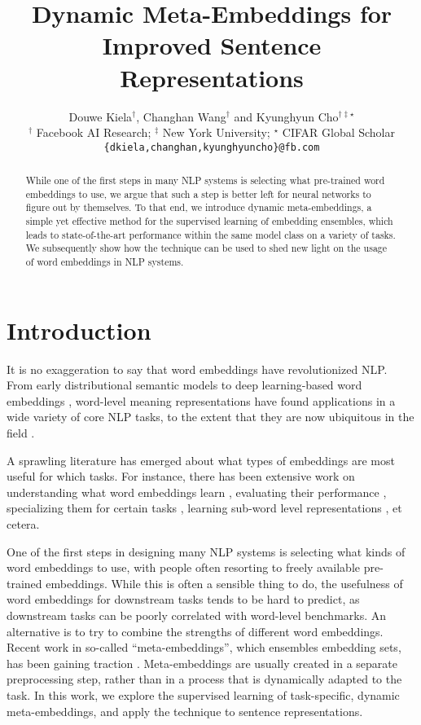 \documentclass[11pt,a4paper]{article}
\title{Dynamic Meta-Embeddings for Improved Sentence Representations}
\author{Douwe Kiela$^{\dagger}$, Changhan Wang$^{\dagger}$ and Kyunghyun Cho$^{\dagger\ddagger\star}$ \\
  $^{\dagger}$ Facebook AI Research; $^\ddagger$ New York University; $^\star$ CIFAR Global Scholar
  \\
  {\tt \{dkiela,changhan,kyunghyuncho\}@fb.com}\\}
\date{}
\begin{document}
\maketitle
\begin{abstract}
While one of the first steps in many NLP systems is selecting what pre-trained word embeddings to use, we argue that such a step is better left for neural networks to figure out by themselves. To that end, we introduce dynamic meta-embeddings, a simple yet effective method for the supervised learning of embedding ensembles, which leads to state-of-the-art performance within the same model class on a variety of tasks. We subsequently show how the technique can be used to shed new light on the usage of word embeddings in NLP systems.
\end{abstract}

\section{Introduction}
It is no exaggeration to say that word embeddings have revolutionized NLP. From early distributional semantic models \cite{Turney:2010jair,Erk:2012llc,Clark:2015book} to deep learning-based word embeddings \cite{Bengio:2003jmlr,Collobert:2008icml,Mikolov:2013nips,Pennington:2014emnlp,Bojanowski:2016arxiv}, word-level meaning representations have found applications in a wide variety of core NLP tasks, to the extent that they are now ubiquitous in the field \cite{Goldberg:2016jair}.

A sprawling literature has emerged about what types of embeddings are most useful for which tasks. For instance, there has been extensive work on understanding what word embeddings learn \cite{Levy:2014nips}, evaluating their performance \cite{Milajevs:2014arxiv,Schnabel:2015emnlp,Bakarov:2017arxiv}, specializing them for certain tasks \cite{Maas:2011acl,Faruqui:2014arxiv,Kiela:2015emnlp,Mrksic:2016acl,Vulic:2017arxiv}, learning sub-word level representations \cite{Wieting:2016arxiv,Bojanowski:2016arxiv,Lee:2016arxiv}, et cetera.

One of the first steps in designing many NLP systems is selecting what kinds of word embeddings to use, with people often resorting to freely available pre-trained embeddings. While this is often a sensible thing to do, the usefulness of word embeddings for downstream tasks tends to be hard to predict, as downstream tasks can be poorly correlated with word-level benchmarks. An alternative is to try to combine the strengths of different word embeddings.  Recent work in so-called ``meta-embeddings'', which ensembles embedding sets, has been gaining traction \cite{Yin:2015arxiv,Bollegala:2017arxiv,Muromagi:2017nodalida,Coates:2018naacl}. Meta-embeddings are usually created in a separate preprocessing step, rather than in a process that is dynamically adapted to the task. In this work, we explore the supervised learning of task-specific, dynamic meta-embeddings, and
apply the technique to sentence representations.
\end{document}
